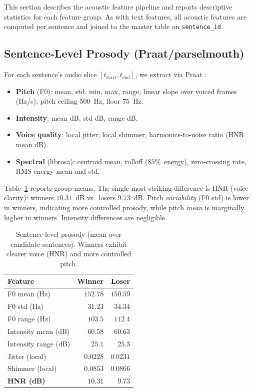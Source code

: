 \documentclass[journal]{IEEEtran}
\begin{document}
This section describes the acoustic feature pipeline and reports
descriptive statistics for each feature group. As with text features,
all acoustic features are computed per sentence and joined to the
master table on \texttt{sentence\_id}.

\subsection{Sentence-Level Prosody (Praat/parselmouth)}
For each sentence's audio slice $[t_{\text{start}}, t_{\text{end}}]$,
we extract via Praat \cite{boersma2024praat}:

\begin{itemize}
  \item \textbf{Pitch} (F0): mean, std, min, max, range, linear slope
        over voiced frames (Hz/s); pitch ceiling $500$~Hz,
        floor $75$~Hz.
  \item \textbf{Intensity}: mean dB, std dB, range dB.
  \item \textbf{Voice quality}: local jitter, local shimmer,
        harmonics-to-noise ratio (HNR mean dB).
  \item \textbf{Spectral} (librosa): centroid mean, rolloff
        ($85\%$~energy), zero-crossing rate, RMS energy mean and std.
\end{itemize}

Table~\ref{tab:prosody} reports group means. The single most striking
difference is HNR (voice clarity): winners $10.31$~dB vs.\ losers
$9.73$~dB. Pitch \emph{variability} (F0 std) is lower in winners,
indicating more controlled prosody, while pitch \emph{mean} is
marginally higher in winners. Intensity differences are negligible.

\begin{table}[t]
\caption{Sentence-level prosody (mean over candidate sentences).
Winners exhibit clearer voice (HNR) and more controlled pitch.}
\label{tab:prosody}
\centering
\begin{tabular}{lrr}
\toprule
Feature                       & Winner    & Loser \\
\midrule
F0 mean (Hz)                  & $152.78$  & $150.59$ \\
F0 std (Hz)                   & $31.23$   & $34.34$ \\
F0 range (Hz)                 & $103.5$   & $112.4$ \\
Intensity mean (dB)           & $60.58$   & $60.63$ \\
Intensity range (dB)          & $25.1$    & $25.3$ \\
Jitter (local)                & $0.0228$  & $0.0231$ \\
Shimmer (local)               & $0.0853$  & $0.0866$ \\
\textbf{HNR (dB)}             & $\mathbf{10.31}$ & $\mathbf{9.73}$ \\
\bottomrule
\end{tabular}
\end{table}
\end{document}
